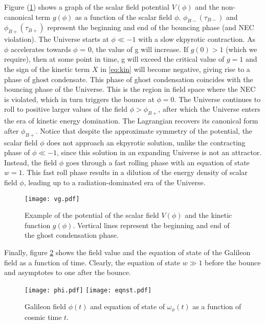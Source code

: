 \documentclass[12pt,a4paper]{article}
\numberwithin{equation}{section}
\numberwithin{equation}{section}
\begin{document}
Figure (\ref{fig:vg}) shows a graph of the scalar field potential $V(\phi)$ and the non-canonical term $g(\phi)$ as a function of the scalar field $\phi$. $\phi_{B-}(\tau_{B-})$ and $\phi_{B+}(\tau_{B+})$ represent the beginning and end of the bouncing phase (and NEC violation).
The Universe starts at $\phi \ll -1$ with a slow ekpyrotic contraction. As $\phi$ accelerates towards $\phi$ = 0, the value of g will
increase. If $g(0)> 1 $  (which we require), then at some point
in time, g will exceed the critical value of $g = 1$
and the sign of the kinetic term $X$ in \eqref{eq:kin} will
become negative, giving rise to a phase of ghost condensate. This phase of ghost condensation coincides with the bouncing phase of the Universe. This is the region in field space where the NEC is violated, which in turn triggers the bounce at $\phi=0$. 
The Universe continues to roll to positive larger values of the field $\phi>\phi_{B+}$, after which the Universe enters the era of kinetic energy domination. %
The Lagrangian recovers its canonical form after $\phi_{B+}$. Notice that despite the approximate symmetry of the potential, the scalar field $\phi$ does not approach an ekpyrotic solution, unlike the contracting phase of $\phi \ll -1$, since this solution in an expanding Universe is not an attractor. Instead, the field $\phi$ goes through a fast rolling phase with an equation of state $w=1$. This fast roll phase results in a dilution of the energy density of scalar field $\phi$, leading up to a radiation-dominated era of the Universe. 
\begin{figure}[H]
    \centering
    \texttt{[image: vg.pdf]} 
     \caption{Example of the potential of the scalar field $V(\phi)$ and the kinetic function $g(\phi)$. Vertical lines represent the beginning and end of the ghost condensation phase.} 
\label{fig:vg}
\end{figure}
Finally, figure \ref{fig:eqnst} shows the field value and the equation of state of the Galileon field as a function of time. Clearly, the equation of state $w\gg1$ before the bounce and asymptotes to one after the bounce.
\begin{figure}[H]
    \centering
    \texttt{[image: phi.pdf]} 
    \hfill
    \texttt{[image: eqnst.pdf]} 
     \caption{ Galileon field $\phi(t)$ and equation of state of $\omega_{\phi}(t)$ as a function of cosmic time $t$.} 
\label{fig:eqnst}
\end{figure}
\end{document}
